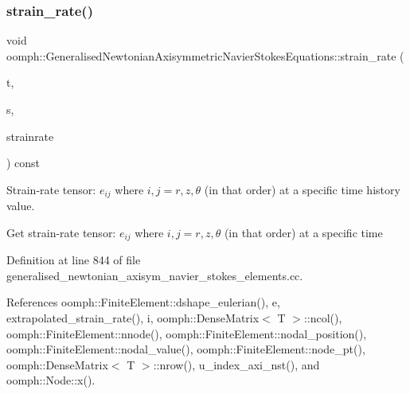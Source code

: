 \mbox{\label{classoomph_1_1GeneralisedNewtonianAxisymmetricNavierStokesEquations_a3659e738deb9899ab1ee2dadf1085bbd}} 
\subsubsection{\texorpdfstring{strain\+\_\+rate()}{strain\_rate()}\hspace{0.1cm}{\footnotesize\ttfamily [2/2]}}
{\footnotesize\ttfamily void oomph\+::\+Generalised\+Newtonian\+Axisymmetric\+Navier\+Stokes\+Equations\+::strain\+\_\+rate (\begin{DoxyParamCaption}\item[{const unsigned \&}]{t,  }\item[{const \hyperlink{classoomph_1_1Vector}{Vector}$<$ double $>$ \&}]{s,  }\item[{\hyperlink{classoomph_1_1DenseMatrix}{Dense\+Matrix}$<$ double $>$ \&}]{strainrate }\end{DoxyParamCaption}) const}



Strain-\/rate tensor\+: $ e_{ij} $ where $ i,j = r,z,\theta $ (in that order) at a specific time history value. 

Get strain-\/rate tensor\+: $ e_{ij} $ where $ i,j = r,z,\theta $ (in that order) at a specific time 

Definition at line 844 of file generalised\+\_\+newtonian\+\_\+axisym\+\_\+navier\+\_\+stokes\+\_\+elements.\+cc.



References oomph\+::\+Finite\+Element\+::dshape\+\_\+eulerian(), e, extrapolated\+\_\+strain\+\_\+rate(), i, oomph\+::\+Dense\+Matrix$<$ T $>$\+::ncol(), oomph\+::\+Finite\+Element\+::nnode(), oomph\+::\+Finite\+Element\+::nodal\+\_\+position(), oomph\+::\+Finite\+Element\+::nodal\+\_\+value(), oomph\+::\+Finite\+Element\+::node\+\_\+pt(), oomph\+::\+Dense\+Matrix$<$ T $>$\+::nrow(), u\+\_\+index\+\_\+axi\+\_\+nst(), and oomph\+::\+Node\+::x().

\mbox{\label{classoomph_1_1GeneralisedNewtonianAxisymmetricNavierStokesEquations_a8df8becab07205931682772c05d1de1c}} 
